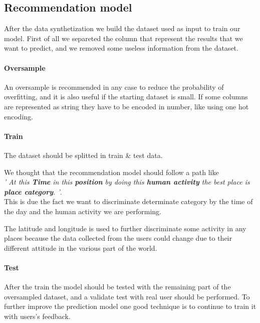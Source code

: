 \documentclass[../../main]{subfiles}
\begin{document}
\subsection{Recommendation model}
After the data synthetization we build the dataset used as input to train our model. 
First of all we separeted the column that represent the results that we want to predict, and we removed some useless information from the dataset.
\paragraph*{Oversample}
An oversample is recommended in any case to reduce the probability of overfitting, and it is also useful if the starting dataset is small.
If some columns are represented as string they have to be encoded in number, like using one hot encoding.
\paragraph*{Train}
\label{paragraph:train_design}
The dataset should be splitted in train \& test data.

We thought that the recommendation model should follow a path like \\\textit{' At this \textbf{Time} in this \textbf{position} by doing this \textbf{human activity} the best place is \textbf{place category}. '}.
\\This is due the fact we want to discriminate determinate category by the time of the day and the human activity we are performing.

The latitude and longitude is used to further discriminate some activity in any places because the data collected from the users could change due to their different attitude in the various part of the world.
\paragraph*{Test}
After the train the model should be tested with the remaining part of the oversampled dataset, and a validate test with real user should be performed.
To further improve the prediction model one good technique is to continue to train it with users's feedback.
\end{document}
